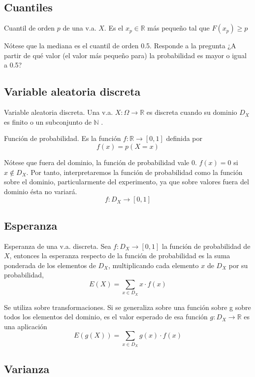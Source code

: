 \documentclass[
]{article}
\begin{document}
\hypertarget{cuantiles}{%
\subsection{Cuantiles}\label{cuantiles}}

Cuantil de orden \(p\) de una v.a. \(X\). Es el \(x_p\in\mathbb{R}\) más
pequeño tal que \(F(x_p)\ge p\)

Nótese que la mediana es el cuantil de orden 0.5. Responde a la pregunta
¿A partir de qué valor (el valor más pequeño para) la probabilidad es
mayor o igual a 0.5?

\hypertarget{variable-aleatoria-discreta}{%
\subsection{Variable aleatoria
discreta}\label{variable-aleatoria-discreta}}

Variable aleatoria discreta. Una v.a.
\(X:\Omega\longrightarrow \mathbb{R}\) es discreta cuando su dominio
\(D_X\) es finito o un subconjunto de \(\mathbb{N}\) .

Función de probabilidad. Es la función
\(f:\mathbb{R}\longrightarrow[0,1]\) definida por \[f(x) = p(X=x)\]

Nótese que fuera del dominio, la función de probabilidad vale 0.
\(f(x)=0\) si \(x\not\in D_X\). Por tanto, interpretaremos la función de
probabilidad como la función sobre el dominio, particularmente del
experimento, ya que sobre valores fuera del dominio ésta no variará.
\[f:D_X\longrightarrow [0,1]\]

\hypertarget{esperanza}{%
\subsection{Esperanza}\label{esperanza}}

Esperanza de una v.a. discreta. Sea \(f:D_X\longrightarrow[0,1]\) la
función de probabilidad de \(X\), entonces la esperanza respecto de la
función de probabilidad es la suma ponderada de los elementos de
\(D_X\), multiplicando cada elemento \(x\) de \(D_X\) por su
probabilidad, \[E(X) = \sum_{x\in D_X}x\cdot f(x)\]

Se utiliza sobre transformaciones. Si se generaliza sobre una función
sobre g sobre todos los elementos del dominio, es el valor esperado de
esa función \(g:D_X\longrightarrow \mathbb{R}\) es una aplicación
\[E(g(X))=\sum_{x\in D_X}g(x)\cdot f(x)\]

\hypertarget{varianza}{%
\subsection{Varianza}\label{varianza}}
\end{document}
